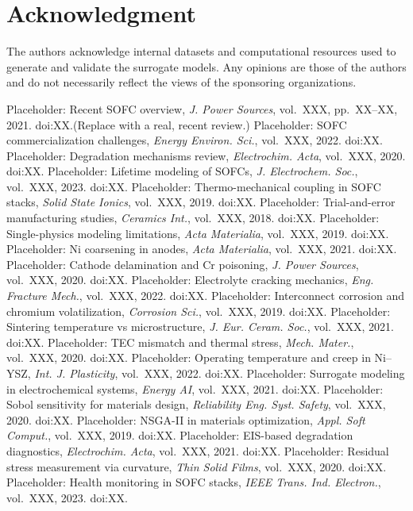 \documentclass[conference]{IEEEtran}
\begin{document}
\section*{Acknowledgment}
The authors acknowledge internal datasets and computational resources used to generate and validate the surrogate models. Any opinions are those of the authors and do not necessarily reflect the views of the sponsoring organizations.

\begin{thebibliography}{99}
 Placeholder: Recent SOFC overview, \emph{J. Power Sources}, vol.~XXX, pp.~XX--XX, 2021. doi:XX.\newline (Replace with a real, recent review.)
 Placeholder: SOFC commercialization challenges, \emph{Energy Environ. Sci.}, vol.~XXX, 2022. doi:XX.
 Placeholder: Degradation mechanisms review, \emph{Electrochim. Acta}, vol.~XXX, 2020. doi:XX.
 Placeholder: Lifetime modeling of SOFCs, \emph{J. Electrochem. Soc.}, vol.~XXX, 2023. doi:XX.
 Placeholder: Thermo-mechanical coupling in SOFC stacks, \emph{Solid State Ionics}, vol.~XXX, 2019. doi:XX.
 Placeholder: Trial-and-error manufacturing studies, \emph{Ceramics Int.}, vol.~XXX, 2018. doi:XX.
 Placeholder: Single-physics modeling limitations, \emph{Acta Materialia}, vol.~XXX, 2019. doi:XX.
 Placeholder: Ni coarsening in anodes, \emph{Acta Materialia}, vol.~XXX, 2021. doi:XX.
 Placeholder: Cathode delamination and Cr poisoning, \emph{J. Power Sources}, vol.~XXX, 2020. doi:XX.
 Placeholder: Electrolyte cracking mechanics, \emph{Eng. Fracture Mech.}, vol.~XXX, 2022. doi:XX.
 Placeholder: Interconnect corrosion and chromium volatilization, \emph{Corrosion Sci.}, vol.~XXX, 2019. doi:XX.
 Placeholder: Sintering temperature vs microstructure, \emph{J. Eur. Ceram. Soc.}, vol.~XXX, 2021. doi:XX.
 Placeholder: TEC mismatch and thermal stress, \emph{Mech. Mater.}, vol.~XXX, 2020. doi:XX.
 Placeholder: Operating temperature and creep in Ni–YSZ, \emph{Int. J. Plasticity}, vol.~XXX, 2022. doi:XX.
 Placeholder: Surrogate modeling in electrochemical systems, \emph{Energy AI}, vol.~XXX, 2021. doi:XX.
 Placeholder: Sobol sensitivity for materials design, \emph{Reliability Eng. Syst. Safety}, vol.~XXX, 2020. doi:XX.
 Placeholder: NSGA-II in materials optimization, \emph{Appl. Soft Comput.}, vol.~XXX, 2019. doi:XX.
 Placeholder: EIS-based degradation diagnostics, \emph{Electrochim. Acta}, vol.~XXX, 2021. doi:XX.
 Placeholder: Residual stress measurement via curvature, \emph{Thin Solid Films}, vol.~XXX, 2020. doi:XX.
 Placeholder: Health monitoring in SOFC stacks, \emph{IEEE Trans. Ind. Electron.}, vol.~XXX, 2023. doi:XX.
\end{thebibliography}
\end{document}
